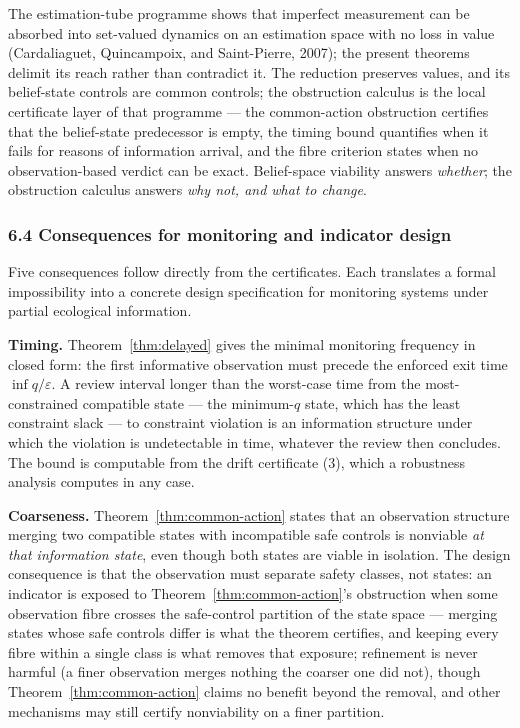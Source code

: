 \documentclass[10pt,twocolumn]{article}
\theoremstyle{definition}
\begin{document}
The estimation-tube programme shows that imperfect measurement can be absorbed into set-valued dynamics on an estimation space with no loss in value (Cardaliaguet, Quincampoix, and Saint-Pierre, 2007); the present theorems delimit its reach rather than contradict it. The reduction preserves values, and its belief-state controls are common controls; the obstruction calculus is the local certificate layer of that programme --- the common-action obstruction certifies that the belief-state predecessor is empty, the timing bound quantifies when it fails for reasons of information arrival, and the fibre criterion states when no observation-based verdict can be exact. Belief-space viability answers \emph{whether}; the obstruction calculus answers \emph{why not, and what to change}.

\subsubsection{6.4 Consequences for monitoring and indicator
design}\label{consequences-for-monitoring-and-indicator-design}



Five consequences follow directly from the certificates. Each translates
a formal impossibility into a concrete design specification for
monitoring systems under partial ecological information.

\textbf{Timing.} Theorem~\ref{thm:delayed} gives the minimal monitoring frequency in
closed form: the first informative observation must precede the enforced
exit time \(\inf q / \varepsilon\). A review interval longer than the
worst-case time from the most-constrained compatible state --- the
minimum-\(q\) state, which has the least constraint slack --- to
constraint violation is an information structure under which the
violation is undetectable in time, whatever the review then concludes.
The bound is computable from the drift certificate (3), which a robustness analysis computes in any case.

\textbf{Coarseness.} Theorem~\ref{thm:common-action} states that an observation structure
merging two compatible states with incompatible safe controls is
nonviable \emph{at that information state}, even though both states are
viable in isolation. The design consequence is that the observation must
separate safety classes, not states: an indicator is exposed to Theorem~\ref{thm:common-action}'s obstruction when some observation fibre crosses the safe-control
partition of the state space --- merging states whose safe controls differ is what the theorem certifies, and keeping every fibre within a single class is what removes that exposure; refinement is never harmful (a finer observation merges nothing the coarser one did not), though Theorem~\ref{thm:common-action}
claims no benefit beyond the removal, and other mechanisms may still
certify nonviability on a finer partition.
\end{document}
